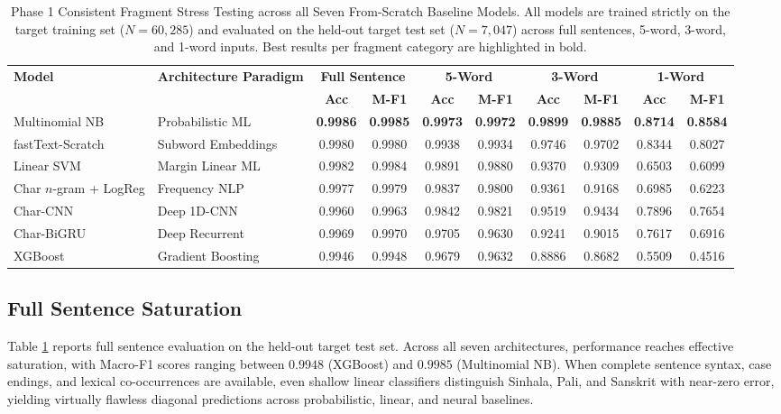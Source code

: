 \documentclass[11pt]{article}
\begin{document}
\begin{table}[t]
\centering
\small
\caption{Phase 1 Consistent Fragment Stress Testing across all Seven From-Scratch Baseline Models. All models are trained strictly on the target training set ($N=60,285$) and evaluated on the held-out target test set ($N=7,047$) across full sentences, 5-word, 3-word, and 1-word inputs. Best results per fragment category are highlighted in bold.}
\label{tab:frag_stress_consistent}
\begin{tabular}{ll cccccccc}
\toprule
\multirow{2}{*}{\textbf{Model}} & \multirow{2}{*}{\textbf{Architecture Paradigm}} & \multicolumn{2}{c}{\textbf{Full Sentence}} & \multicolumn{2}{c}{\textbf{5-Word}} & \multicolumn{2}{c}{\textbf{3-Word}} & \multicolumn{2}{c}{\textbf{1-Word}} \\
\cmidrule(lr){3-4} \cmidrule(lr){5-6} \cmidrule(lr){7-8} \cmidrule(lr){9-10}
& & \textbf{Acc} & \textbf{M-F1} & \textbf{Acc} & \textbf{M-F1} & \textbf{Acc} & \textbf{M-F1} & \textbf{Acc} & \textbf{M-F1} \\
\midrule
Multinomial NB & Probabilistic ML & \textbf{0.9986} & \textbf{0.9985} & \textbf{0.9973} & \textbf{0.9972} & \textbf{0.9899} & \textbf{0.9885} & \textbf{0.8714} & \textbf{0.8584} \\
fastText-Scratch & Subword Embeddings & 0.9980 & 0.9980 & 0.9938 & 0.9934 & 0.9746 & 0.9702 & 0.8344 & 0.8027 \\
Linear SVM & Margin Linear ML & 0.9982 & 0.9984 & 0.9891 & 0.9880 & 0.9370 & 0.9309 & 0.6503 & 0.6099 \\
Char $n$-gram + LogReg & Frequency NLP & 0.9977 & 0.9979 & 0.9837 & 0.9800 & 0.9361 & 0.9168 & 0.6985 & 0.6223 \\
Char-CNN & Deep 1D-CNN & 0.9960 & 0.9963 & 0.9842 & 0.9821 & 0.9519 & 0.9434 & 0.7896 & 0.7654 \\
Char-BiGRU & Deep Recurrent & 0.9969 & 0.9970 & 0.9705 & 0.9630 & 0.9241 & 0.9015 & 0.7617 & 0.6916 \\
XGBoost & Gradient Boosting & 0.9946 & 0.9948 & 0.9679 & 0.9632 & 0.8886 & 0.8682 & 0.5509 & 0.4516 \\
\bottomrule
\end{tabular}
\end{table}

\subsection{Full Sentence Saturation}
Table \ref{tab:frag_stress_consistent} reports full sentence evaluation on the held-out target test set. Across all seven architectures, performance reaches effective saturation, with Macro-F1 scores ranging between $0.9948$ (XGBoost) and $0.9985$ (Multinomial NB). When complete sentence syntax, case endings, and lexical co-occurrences are available, even shallow linear classifiers distinguish Sinhala, Pali, and Sanskrit with near-zero error, yielding virtually flawless diagonal predictions across probabilistic, linear, and neural baselines.
\end{document}
